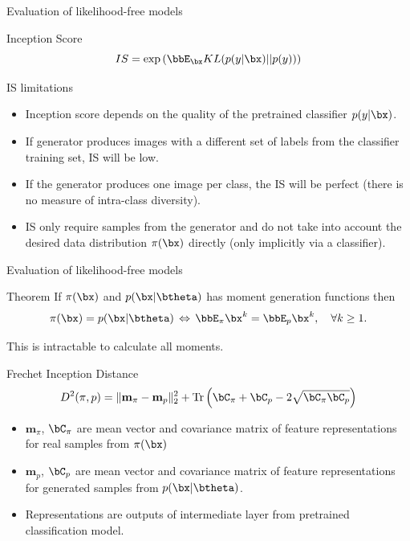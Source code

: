 \begin{frame}{Evaluation of likelihood-free models}
	\begin{block}{Inception Score}
		\vspace{-0.1cm}
		\[
			IS =  \exp \left( \bbE_{\bx} KL(p(y | \bx) || p(y)) \right)
		\]
		\vspace{-0.1cm}
	\end{block}
	\begin{block}{IS limitations}
		\begin{itemize}
			\item Inception score depends on the quality of the pretrained classifier $p(y | \bx)$.
			\item If generator produces images with a different set of labels from the classifier training set, IS will be low.
			\item If the generator produces one image per class, the IS will be perfect (there is no measure of intra-class diversity).
			\item IS only require samples from the generator and do not take into account the desired data distribution $\pi(\bx)$ directly (only implicitly via a classifier).
		\end{itemize}
	\end{block}
\end{frame}
\begin{frame}{Evaluation of likelihood-free models}
	\begin{block}{Theorem}
		If $\pi(\bx)$ and $p(\bx | \btheta)$ has moment generation functions then
		\[
			\pi(\bx) = p(\bx | \btheta) \, \Leftrightarrow \, \bbE_{\pi} \bx^k = \bbE_{p} \bx^k, \quad \forall k \geq 1.
		\]
	\end{block}
	This is intractable to calculate all moments.
	\begin{block}{Frechet Inception Distance}
		\vspace{-0.1cm}
		\[
			D^2 (\pi, p) = \| \mathbf{m}_{\pi} - \mathbf{m}_{p}\|_2^2 + \text{Tr} \left( \bC_{\pi} + \bC_p - 2 \sqrt{\bC_{\pi} \bC_p} \right)
		\]
	\end{block}
	\begin{itemize}
		\item $\mathbf{m}_{\pi}$, $\bC_{\pi} $ are mean vector and covariance matrix of feature representations for real samples from $\pi(\bx)$
		\item $\mathbf{m}_{p}$, $\bC_p$ are mean vector and covariance matrix of feature representations for generated samples from $p(\bx | \btheta)$.
		\item Representations are outputs of intermediate layer from pretrained classification model.
	\end{itemize} 

\end{frame}
